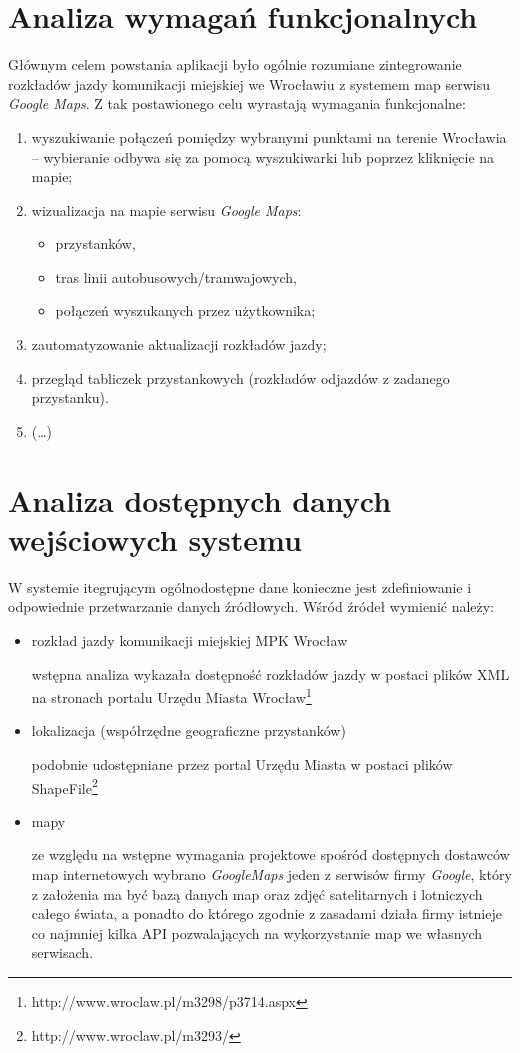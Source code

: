 \documentclass[a4paper,12pt]{article}
\begin{document}
\section{Analiza wymagań funkcjonalnych}
Głównym celem powstania aplikacji było ogólnie rozumiane zintegrowanie
rozkładów jazdy komunikacji miejskiej we Wrocławiu z systemem map serwisu
\emph{Google Maps}. Z tak postawionego celu wyrastają wymagania funkcjonalne:
\begin{enumerate}
  \item wyszukiwanie połączeń pomiędzy wybranymi punktami na terenie Wrocławia
  -- wybieranie odbywa się za pomocą wyszukiwarki lub poprzez kliknięcie na
  mapie;
  \item wizualizacja na mapie serwisu \emph{Google Maps}:
  \begin{itemize}
    \item przystanków,
    \item tras linii autobusowych/tramwajowych,
    \item połączeń wyszukanych przez użytkownika;
  \end{itemize}
  \item zautomatyzowanie aktualizacji rozkładów jazdy;
  \item przegląd tabliczek przystankowych (rozkładów odjazdów z zadanego
  przystanku).
  \item (\ldots)
\end{enumerate}
\section{Analiza dostępnych danych wejściowych systemu}
W systemie itegrującym ogólnodostępne dane konieczne jest zdefiniowanie i
odpowiednie przetwarzanie danych źródłowych. Wśród źródeł wymienić należy:
\begin{itemize}
  \item rozkład jazdy komunikacji miejskiej MPK Wrocław
  
  wstępna analiza wykazała dostępność rozkładów jazdy w postaci plików XML
  na stronach portalu Urzędu Miasta
  Wrocław\footnote{http://www.wroclaw.pl/m3298/p3714.aspx}
  \item lokalizacja (współrzędne geograficzne przystanków)

   podobnie udostępniane przez portal Urzędu Miasta w postaci plików
   ShapeFile\footnote{http://www.wroclaw.pl/m3293/}
  \item mapy 
  
  ze względu na wstępne wymagania projektowe spośród dostępnych dostawców map
  internetowych wybrano \emph{GoogleMaps} jeden z serwisów firmy \emph{Google},
  który z założenia ma być bazą danych map oraz zdjęć satelitarnych i
  lotniczych całego świata, a ponadto do którego zgodnie z zasadami działa
  firmy istnieje co najmniej kilka API pozwalających na wykorzystanie map we
  własnych serwisach.
\end{itemize}
\end{document}

